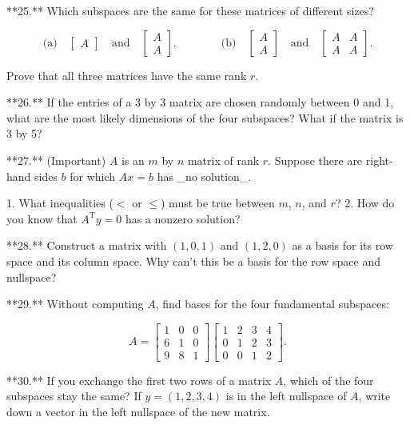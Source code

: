 

**25.** Which subspaces are the same for these matrices of different sizes?

\[\text{(a)}\quad\begin{bmatrix}A\end{bmatrix}\quad\text{and}\quad\begin{bmatrix} A\\ A\end{bmatrix}.\qquad\qquad\text{(b)}\quad\begin{bmatrix}A\\ A\end{bmatrix}\quad\text{and}\quad\begin{bmatrix}A&A\\ A&A\end{bmatrix}.\]

Prove that all three matrices have the same rank \(r\).

**26.** If the entries of a 3 by 3 matrix are chosen randomly between 0 and 1, what are the most likely dimensions of the four subspaces? What if the matrix is 3 by 5?

**27.** (Important) \(A\) is an \(m\) by \(n\) matrix of rank \(r\). Suppose there are right-hand sides \(b\) for which \(Ax=b\) has _no solution_.

1. What inequalities (\(<\) or \(\leq\)) must be true between \(m\), \(n\), and \(r\)?
2. How do you know that \(A^{\text{T}}y=0\) has a nonzero solution?

**28.** Construct a matrix with \((1,0,1)\) and \((1,2,0)\) as a basis for its row space and its column space. Why can't this be a basis for the row space and nullspace?

**29.** Without computing \(A\), find bases for the four fundamental subspaces:

\[A=\begin{bmatrix}1&0&0\\ 6&1&0\\ 9&8&1\end{bmatrix}\begin{bmatrix}1&2&3&4\\ 0&1&2&3\\ 0&0&1&2\end{bmatrix}.\]

**30.** If you exchange the first two rows of a matrix \(A\), which of the four subspaces stay the same? If \(y=(1,2,3,4)\) is in the left nullspace of \(A\), write down a vector in the left nullspace of the new matrix.

